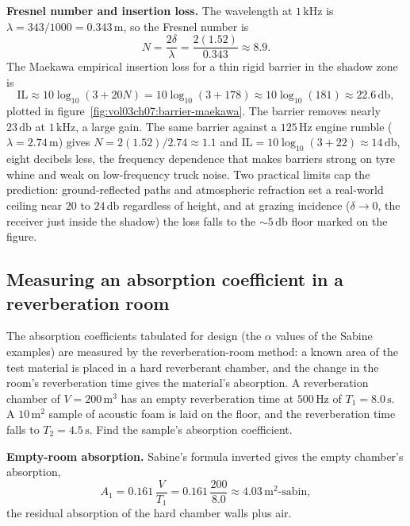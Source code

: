 \textbf{Fresnel number and insertion loss.} The wavelength at
$1\,\si{\kilo\hertz}$ is $\lambda = 343/1000 = 0.343\,\si{\meter}$, so the
Fresnel number is
\[
N = \frac{2\delta}{\lambda} = \frac{2(1.52)}{0.343} \approx 8.9 .
\]
The Maekawa empirical insertion loss for a thin rigid barrier in the
shadow zone is
\[
\text{IL} \approx 10\log_{10}(3 + 20N) = 10\log_{10}(3 + 178)
        \approx 10\log_{10}(181) \approx 22.6\,\si{\decibel},
\]
plotted in figure~\ref{fig:vol03ch07:barrier-maekawa}. The barrier
removes nearly $23\,\si{\decibel}$ at $1\,\si{\kilo\hertz}$, a large gain.
The same barrier against a $125\,\si{\hertz}$ engine rumble
($\lambda=2.74\,\si{\meter}$) gives $N=2(1.52)/2.74\approx 1.1$ and
$\text{IL}=10\log_{10}(3+22)\approx 14\,\si{\decibel}$, eight decibels
less, the frequency dependence that makes barriers strong on tyre whine
and weak on low-frequency truck noise. Two practical limits cap the
prediction: ground-reflected paths and atmospheric refraction set a
real-world ceiling near $20$ to $24\,\si{\decibel}$ regardless of height,
and at grazing incidence ($\delta\to 0$, the receiver just inside the
shadow) the loss falls to the $\sim 5\,\si{\decibel}$ floor marked on the
figure.



\subsection{Measuring an absorption coefficient in a reverberation room}

The absorption coefficients tabulated for design (the $\alpha$ values of
the Sabine examples) are measured by the reverberation-room method: a
known area of the test material is placed in a hard reverberant chamber,
and the change in the room's reverberation time gives the material's
absorption. A reverberation chamber of $V=200\,\si{\meter\cubed}$ has an
empty reverberation time at $500\,\si{\hertz}$ of $T_1=8.0\,\si{\second}$.
A $10\,\si{\meter\squared}$ sample of acoustic foam is laid on the floor,
and the reverberation time falls to $T_2=4.5\,\si{\second}$. Find the
sample's absorption coefficient.

\textbf{Empty-room absorption.} Sabine's formula inverted gives the empty
chamber's absorption,
\[
A_1 = 0.161\,\frac{V}{T_1} = 0.161\,\frac{200}{8.0}
    \approx 4.03\,\si{\meter\squared}\text{-sabin},
\]
the residual absorption of the hard chamber walls plus air.

